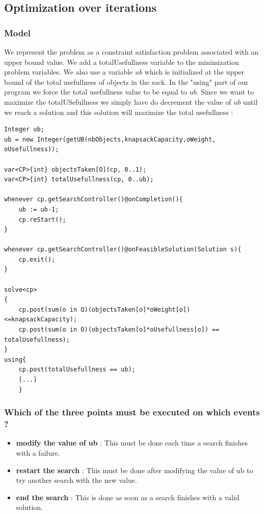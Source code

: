 \documentclass{eplDoc}
\begin{document}
\subsection{Optimization over iterations} %
\subsubsection{Model}
We represent the problem as a constraint satisfaction problem associated with an upper bound value. We add a totalUsefullness variable to the minimization problem variables. We also use a variable $ub$ which is initialized at the upper bound of the total usefullness of objects in the sack. In the "using" part of our program we force the total usefullness value to be equal to $ub$. Since we want to maximize the totalUSefullness we simply have do decrement the value of $ub$ until we reach a solution and this solution will maximize the total usefullness :  \\  
\begin{lstlisting}
Integer ub;
ub = new Integer(getUB(nbObjects,knapsackCapacity,oWeight, oUsefullness));

var<CP>{int} objectsTaken[O](cp, 0..1);             
var<CP>{int} totalUsefullness(cp, 0..ub);  

whenever cp.getSearchController()@onCompletion(){
    ub := ub-1;
    cp.reStart();
}

whenever cp.getSearchController()@onFeasibleSolution(Solution s){
    cp.exit();
}

solve<cp>
{
    cp.post(sum(o in O)(objectsTaken[o]*oWeight[o])<=knapsackCapacity);
    cp.post(sum(o in O)(objectsTaken[o]*oUsefullness[o]) == totalUsefullness);
}
using{
    cp.post(totalUsefullness == ub);
    [...]
    }
\end{lstlisting}
\subsubsection{Which of the three points must be executed on which events ?}
\begin{itemize}
	\item \textbf{modify the value of ub} : This must be done each time a search finishes with a failure.
	\item \textbf{restart the search} : This must be done after modifying the value of ub to try another search with the new value.
	\item \textbf{end the search} : This is done as soon as a search finishes with a valid solution.
\end{itemize}
\end{document}
